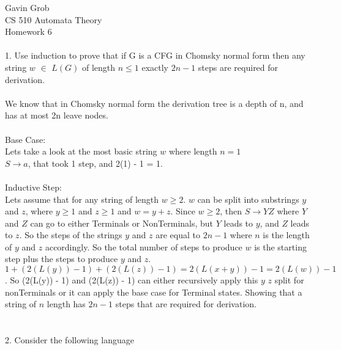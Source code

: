\documentclass[11pt, oneside]{article}   	%
\begin{document}
\noindent Gavin Grob
\\CS 510 Automata Theory
\\Homework 6
\\
\\1. Use induction to prove that if G is a CFG in Chomsky normal form then any string $w$ $\in$ $L(G)$ of length $n \leq 1$ exactly $2n-1$ steps are required for derivation.
\\
\\We know that in Chomsky normal form the derivation tree is a depth of n, and has at most 2n leave nodes. 
\\
\\Base Case:
\\Lets take a look at the most basic string $w$ where length $n=1$
\\$S \rightarrow a$, that took 1 step, and 2(1) - 1 = 1.
\\
\\Inductive Step: 
\\Lets assume that for any string of length $w \geq 2$. $w$ can be split into substrings $y$ and $z$, where $y \geq 1$ and $z \geq 1$ and $w = y + z$. Since $w \geq 2$, then $S \rightarrow YZ$ where $Y$ and $Z$ can go to either Terminals or NonTerminals, but $Y$ leads to $y$, and $Z$ leads to $z$. So the steps of the strings $y$ and $z$ are equal to $2n-1$ where $n$ is the length of $y$ and $z$ accordingly. So the total number of steps to produce $w$ is the starting step plus the steps to produce $y$ and $z$. $1 + (2(L(y)) -1) + (2(L(z)) - 1) = 2(L(x + y)) - 1 = 2(L(w)) - 1$. So (2(L(y)) - 1) and (2(L(z)) - 1) can either recursively apply this $y$ $z$ split for nonTerminals or it can apply the base case for Terminal states. Showing that a string of $n$ length has $2n-1$ steps that are required for derivation.
\\
\\
\\2. Consider the following language
\end{document}
